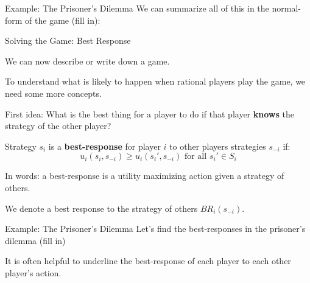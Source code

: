 \documentclass[aspectratio=169]{beamer}
\newenvironment{wideitemize}{\itemize\addtolength{\itemsep}{10pt}}{\enditemize}
\begin{document}
\begin{frame}{Example: The Prisoner's Dilemma}
We can summarize all of this in the normal-form of the game (fill in):

\vspace{6cm}
\end{frame}

\begin{frame}{Solving the Game: Best Response}
\begin{wideitemize}
    \item We can now describe or write down a game.
    \item To understand what is likely to happen when rational players play the game, we need some more concepts.
    \item First idea: What is the best thing for a player to do if that player \textbf{knows} the strategy of the other player?
    \begin{definition}
Strategy $s_i$ is a \textbf{best-response} for player $i$ to other players strategies $s_{-i}$ if:
\[u_i(s_i, s_{-i}) \geq u_i(s_i', s_{-i}) \text{ for all } s_i' \in S_i \]

\end{definition}
\item In words: a best-response is a utility maximizing action given a strategy of others.
\item We denote a best response to the strategy of others $BR_i(s_{-i})$.
\end{wideitemize}


\end{frame}

\begin{frame}{Example: The Prisoner's Dilemma}
Let's find the best-responses in the prisoner's dilemma (fill in)

\vspace{6cm}

It is often helpful to underline the best-response of each player to each other player's action.
\end{frame}
\end{document}
